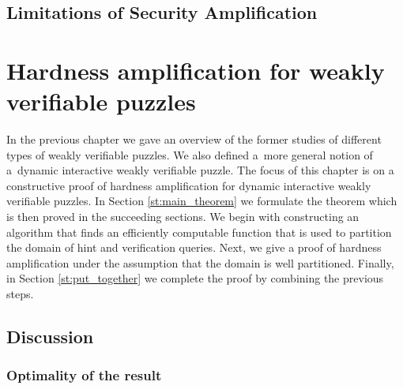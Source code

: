 \documentclass[11pt,a4paper,titlepage]{memoir}
\begin{document}
\section{Limitations of Security Amplification}
%
\chapter{Hardness amplification for weakly verifiable puzzles}
\label{ch:main_result}
In the previous chapter we gave an overview of the former studies of different types of weakly verifiable puzzles.
We also defined a~more general notion of a~dynamic interactive weakly verifiable puzzle.
The focus of this chapter is on a constructive proof of hardness amplification for dynamic interactive weakly verifiable puzzles.
In Section \ref{st:main_theorem} we formulate the theorem which is then proved in the succeeding sections.
We begin with constructing an algorithm that finds an efficiently computable function that is used
to partition the domain of hint and verification queries. Next, we give a proof of hardness amplification
under the assumption that the domain is well partitioned. Finally, in Section \ref{st:put_together}
we complete the proof by combining the previous steps.
%

%

%

%

%
\section{Discussion}
\subsection{Optimality of the result}
%
%
\appendix


\backmatter



\end{document}
